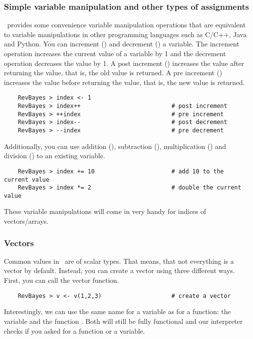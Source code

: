 \subsubsection*{Simple variable manipulation and other types of assignments}
\Rev~provides some convenience variable manipulation operations that are equivalent to variable manipulations in other programming languages such as C/C++, Java and Python.
You can increment (\cl{++}) and decrement (\cl{--}) a variable.
The increment operation increases the current value of a variable by 1 and the decrement operation decreases the value by 1.
A post increment () increases the value after returning the value, that is, the old value is returned.
A pre increment () increases the value before returning the value, that is, the new value is returned.
{\tt \begin{snugshade*}
\begin{lstlisting}    
    RevBayes > index <- 1
    RevBayes > index++                          # post increment
    RevBayes > ++index                          # pre increment
    RevBayes > index--                          # post decrement
    RevBayes > --index                          # pre decrement
\end{lstlisting}
\end{snugshade*}}
Additionally, you can use addition (), subtraction (), multiplication () and division () to an existing variable.
{\tt \begin{snugshade*}
\begin{lstlisting}    
    RevBayes > index += 10                      # add 10 to the current value
    RevBayes > index *= 2                       # double the current value
\end{lstlisting}
\end{snugshade*}}
These variable manipulations will come in very handy for indices of vectors/arrays.

\subsubsection*{Vectors}
Common values in \RevBayes~are of scalar types.
That means, that not everything is a vector by default.
Instead, you can create a vector using three different ways.
First, you can call the vector function.
{\tt \begin{snugshade*}
\begin{lstlisting}    
    RevBayes > v <- v(1,2,3)                    # create a vector
\end{lstlisting}
\end{snugshade*}}
Interestingly, we can use the same name for a variable as for a function: the variable  and the function .
Both will still be fully functional and our interpreter checks if you asked for a function or a variable.

